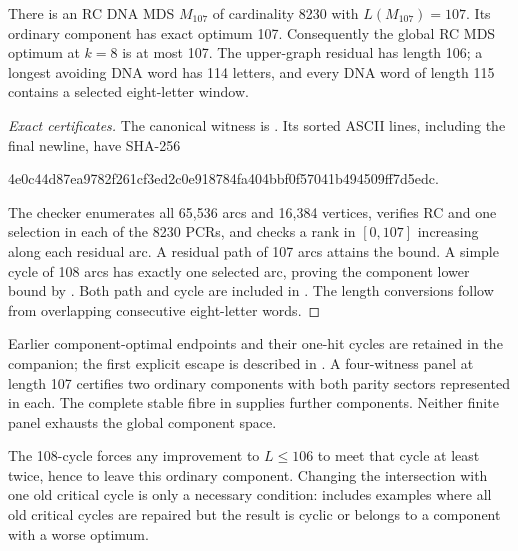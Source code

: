 \begin{theorem}
\label{thm:construction-107}
There is an RC DNA MDS $M_{107}$ of cardinality 8230 with
$L(M_{107})=107$. Its ordinary component has exact optimum 107.
Consequently the global RC MDS optimum at $k=8$ is at most 107.
The upper-graph residual has length 106; a longest avoiding DNA
word has 114 letters, and every DNA word of length 115 contains
a selected eight-letter window.
\end{theorem}
\begin{proof}[Exact certificates]
The canonical witness is .
Its sorted ASCII lines, including the final newline, have SHA-256
\begin{center}\ttfamily\small
4e0c44d87ea9782f261cf3ed2c0e918784fa404bbf0f57041b494509ff7d5edc.
\end{center}
The checker enumerates all 65,536 arcs and 16,384 vertices, verifies
RC and one selection in each of the 8230 PCRs, and checks a rank
in $[0,107]$ increasing along each residual arc. A residual path
of 107 arcs attains the bound. A simple cycle of 108 arcs has
exactly one selected arc, proving the component lower bound by
. Both path and cycle are included in
. The length conversions follow
from overlapping consecutive eight-letter words.
\end{proof}

Earlier component-optimal endpoints and their one-hit cycles are retained
in the companion; the first explicit escape is described in
. A four-witness panel at length 107 certifies
two ordinary components with both parity sectors represented in each.
The complete stable fibre in  supplies further
components. Neither finite panel exhausts the global component space.

The 108-cycle forces any improvement to $L\le106$ to meet that
cycle at least twice, hence to leave this ordinary component.
Changing the intersection with one old critical cycle is only a
necessary condition:  includes examples
where all old critical cycles are repaired but the result is cyclic
or belongs to a component with a worse optimum.
